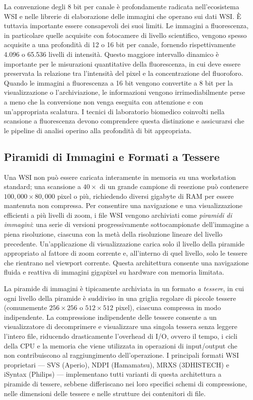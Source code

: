 La convenzione degli 8 bit per canale è profondamente radicata nell'ecosistema WSI e nelle librerie di elaborazione delle immagini che operano sui dati WSI. È tuttavia importante essere consapevoli dei suoi limiti. Le immagini a fluorescenza, in particolare quelle acquisite con fotocamere di livello scientifico, vengono spesso acquisite a una profondità di 12 o 16 bit per canale, fornendo rispettivamente 4.096 o 65.536 livelli di intensità. Questo maggiore intervallo dinamico è importante per le misurazioni quantitative della fluorescenza, in cui deve essere preservata la relazione tra l'intensità del pixel e la concentrazione del fluoroforo. Quando le immagini a fluorescenza a 16 bit vengono convertite a 8 bit per la visualizzazione o l'archiviazione, le informazioni vengono irrimediabilmente perse a meno che la conversione non venga eseguita con attenzione e con un'appropriata scalatura. I tecnici di laboratorio biomedico coinvolti nella scansione a fluorescenza devono comprendere questa distinzione e assicurarsi che le pipeline di analisi operino alla profondità di bit appropriata.

\subsection{Piramidi di Immagini e Formati a Tessere}

Una WSI non può essere caricata interamente in memoria su una workstation standard; una scansione a $40\times$ di un grande campione di resezione può contenere $100{,}000 \times 80{,}000$ pixel o più, richiedendo diversi gigabyte di RAM per essere mantenuta non compressa. Per consentire una navigazione e una visualizzazione efficienti a più livelli di zoom, i file WSI vengono archiviati come \emph{piramidi di immagini}: una serie di versioni progressivamente sottocampionate dell'immagine a piena risoluzione, ciascuna con la metà della risoluzione lineare del livello precedente. Un'applicazione di visualizzazione carica solo il livello della piramide appropriato al fattore di zoom corrente e, all'interno di quel livello, solo le tessere che rientrano nel viewport corrente. Questa architettura consente una navigazione fluida e reattiva di immagini gigapixel su hardware con memoria limitata.

La piramide di immagini è tipicamente archiviata in un formato \emph{a tessere}, in cui ogni livello della piramide è suddiviso in una griglia regolare di piccole tessere (comunemente $256 \times 256$ o $512 \times 512$ pixel), ciascuna compressa in modo indipendente. La compressione indipendente delle tessere consente a un visualizzatore di decomprimere e visualizzare una singola tessera senza leggere l'intero file, riducendo drasticamente l'overhead di I/O, ovvero il tempo, i cicli della CPU e la memoria che viene utilizzata in operazioni di input/output che non contribuiscono al raggiungimento dell'operazione. I principali formati WSI proprietari --- SVS (Aperio), NDPI (Hamamatsu), MRXS (3DHISTECH) e iSyntax (Philips) --- implementano tutti varianti di questa architettura a piramide di tessere, sebbene differiscano nei loro specifici schemi di compressione, nelle dimensioni delle tessere e nelle strutture dei contenitori di file.

